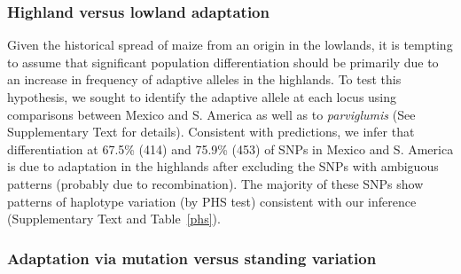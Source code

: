 \subsubsection{Highland versus lowland adaptation}  

Given the historical spread of maize from an origin in the lowlands, it is tempting to assume that significant population differentiation should be primarily due to an increase in frequency of adaptive alleles in the highlands.
To test this hypothesis, we sought to identify the adaptive allele at each locus using comparisons between Mexico and S. America as well as to \emph{parviglumis} (See Supplementary Text  for details).  
Consistent with predictions, we infer that differentiation at 67.5\% (414) and 75.9\% (453) of SNPs in Mexico and S. America is due to adaptation in the highlands after excluding the SNPs with ambiguous patterns (probably due to recombination). 
The majority of these SNPs show patterns of haplotype variation (by PHS test) consistent with our inference (Supplementary Text and Table~\ref{phs}).

\subsubsection{Adaptation via mutation versus standing variation}


